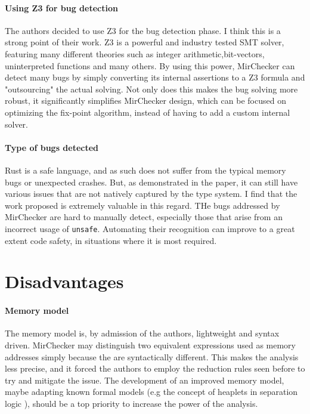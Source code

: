 \documentclass{article}
\begin{document}
 \paragraph{Using Z3 for bug detection} The authors decided to use Z3 for the bug detection phase. I think this is a 
 strong point of their work. Z3 is a powerful and industry tested SMT solver, featuring many different theories such as integer 
 arithmetic,bit-vectors, uninterpreted functions and many others. By using this power, MirChecker can detect many bugs by simply 
 converting its internal assertions to a Z3 formula and "outsourcing" the actual solving. Not only does this makes the bug solving more robust, 
 it significantly simplifies MirChecker design, which can be focused on optimizing the fix-point algorithm, instead of having to add a custom internal solver.

 \paragraph{Type of bugs detected} Rust is a safe language, and as such does not suffer from the typical memory bugs or unexpected crashes. But, as demonstrated in the paper, 
 it can still have various issues that are not natively captured by the type system. I find that the work proposed is extremely valuable in this regard. THe bugs addressed by MirChecker
 are hard to manually detect, especially those that arise from an incorrect usage of \texttt{unsafe}. Automating their recognition can improve to a great extent code safety, in situations 
 where it is most required.
\section{Disadvantages}

\paragraph{Memory model}
The memory model is, by admission of the authors, lightweight and syntax driven. MirChecker may distinguish 
two  equivalent expressions used as memory addresses simply because the are syntactically different. This makes the analysis 
less precise, and it forced the authors to employ the reduction rules seen before to try and mitigate the issue. The development of an improved
memory model, maybe adapting known formal models  (e.g the concept of heaplets in separation logic \cite{o2019separation}), should be a top priority to  
increase the power of the analysis.
\end{document}
